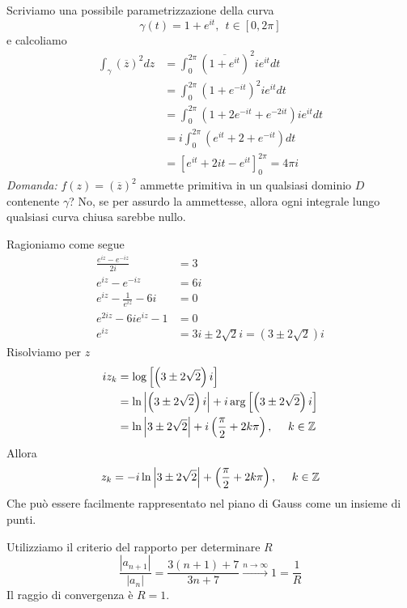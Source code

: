 Scriviamo una possibile parametrizzazione della curva
\begin{equation*}
\gamma \left( t\right) =1+e^{it} ,\ \ t\in \left[ 0,2\pi \right]
\end{equation*}
e calcoliamo
\begin{align*}
\int\nolimits _{\gamma }\left(\overline{z}\right)^{2} dz & =\int\nolimits ^{2\pi }_{0}\left(\overline{1+e^{it}}\right)^{2} ie^{it} dt\\
 & =\int\nolimits ^{2\pi }_{0}\left( 1+e^{-it}\right)^{2} ie^{it} dt\\
 & =\int\nolimits ^{2\pi }_{0}\left( 1+2e^{-it} +e^{-2it}\right) ie^{it} dt\\
 & =i\int\nolimits ^{2\pi }_{0}\left( e^{it} +2+e^{-it}\right) dt\\
 & =\left[ e^{it} +2it-e^{it}\right]^{2\pi }_{0} =4\pi i
\end{align*}
\textit{Domanda:} $f\left( z\right) =\left(\overline{z}\right)^{2}$ ammette primitiva in un qualsiasi dominio $D$ contenente $\gamma $? No, se per assurdo la ammettesse, allora ogni integrale lungo qualsiasi curva chiusa sarebbe nullo.
\Soluzione

Ragioniamo come segue
\begin{align*}
\frac{e^{iz} -e^{-iz}}{2i} & =3\\
e^{iz} -e^{-iz} & =6i\\
e^{iz} -\frac{1}{e^{iz}} -6i & =0\\
e^{2iz} -6ie^{iz} -1 & =0\\
e^{iz} & =3i\pm 2\sqrt{2} i=\left( 3\pm 2\sqrt{2}\right) i
\end{align*}
Risolviamo per $z$
\begin{align*}
iz_{k} & =\log\left[\left( 3\pm 2\sqrt{2}\right) i\right]\\
 & =\ln\left| \left( 3\pm 2\sqrt{2}\right) i\right| +i\arg\left[\left( 3\pm 2\sqrt{2}\right) i\right]\\
 & =\ln\left| 3\pm 2\sqrt{2}\right| +i\left(\frac{\pi }{2} +2k\pi \right) ,\ \ \ \ k\in \mathbb{Z} 
\end{align*}
Allora
\begin{equation*}
z_{k} =-i\ln\left| 3\pm 2\sqrt{2}\right| +\left(\frac{\pi }{2} +2k\pi \right) ,\ \ \ \ k\in \mathbb{Z} 
\end{equation*}
Che può essere facilmente rappresentato nel piano di Gauss come un insieme di punti.
\Soluzione

Utilizziamo il criterio del rapporto per determinare $R$
\begin{equation*}
\frac{\left| a_{n+1}\right| }{\left| a_{n}\right| } =\frac{3\left( n+1\right) +7}{3n+7}\xrightarrow{n\rightarrow \infty } 1=\frac{1}{R}
\end{equation*}
Il raggio di convergenza è $R=1$.

